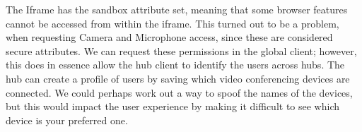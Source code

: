 \documentclass{report}
\theoremstyle{definition}
\theoremstyle{remark}
\begin{document}
The Iframe has the sandbox attribute set, meaning that some browser features cannot be accessed from within the iframe. This turned out to be a problem, when requesting Camera and Microphone access, since these are considered secure attributes. We can request these permissions in the global client; however, this does in essence allow the hub client to identify the users across hubs. The hub can create a profile of users by saving which video conferencing devices are connected. We could perhaps work out a way to spoof the names of the devices, but this would impact the user experience by making it difficult to see which device is your preferred one.















\end{document}
